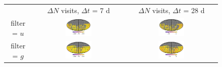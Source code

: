 \documentclass[preprintm,linenumbers]{aastex631}
\begin{document}
		\begin{figure}
			\centering
			\begin{tabular}{c c c}
				& $\Delta N$ visits, $\Delta t$ = 7 d & $\Delta N$ visits, $\Delta t$ = 28 d \\
				filter = $u$ & \includegraphics[align=c,width=0.3\textwidth]{results/skymaps/skymaps_delta_first_year_one_snap_v4_0_10yrs_db_noDD_noTwi_CountMetric_doAllTemplateMetrics_reduceCount_u_7_noDD_noTwi} &				
				\includegraphics[align=c,width=0.3\textwidth]{results/skymaps/skymaps_delta_first_year_one_snap_v4_0_10yrs_db_noDD_noTwi_CountMetric_doAllTemplateMetrics_reduceCount_u_28_noDD_noTwi} \\
				
				filter = $g$ & \includegraphics[align=c,width=0.3\textwidth]{results/skymaps/skymaps_delta_first_year_one_snap_v4_0_10yrs_db_noDD_noTwi_CountMetric_doAllTemplateMetrics_reduceCount_g_7_noDD_noTwi} &				
				\includegraphics[align=c,width=0.3\textwidth]{results/skymaps/skymaps_delta_first_year_one_snap_v4_0_10yrs_db_noDD_noTwi_CountMetric_doAllTemplateMetrics_reduceCount_g_28_noDD_noTwi} \\
				

\end{tabular}
\end{figure}
\end{document}
